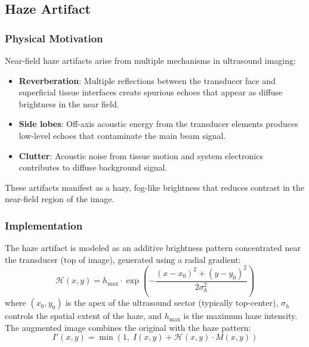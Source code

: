 \documentclass{article}
\theoremstyle{plain}
\theoremstyle{definition}
\theoremstyle{remark}
\begin{document}
\subsection{Haze Artifact}
\label{appendix:haze_artifact}

\subsubsection{Physical Motivation}

Near-field haze artifacts arise from multiple mechanisms in ultrasound imaging:
\begin{itemize}
    \item \textbf{Reverberation}: Multiple reflections between the transducer face and superficial tissue interfaces create spurious echoes that appear as diffuse brightness in the near field.
    \item \textbf{Side lobes}: Off-axis acoustic energy from the transducer elements produces low-level echoes that contaminate the main beam signal.
    \item \textbf{Clutter}: Acoustic noise from tissue motion and system electronics contributes to diffuse background signal.
\end{itemize}

These artifacts manifest as a hazy, fog-like brightness that reduces contrast in the near-field region of the image.

\subsubsection{Implementation}

The haze artifact is modeled as an additive brightness pattern concentrated near the transducer (top of image), generated using a radial gradient:
\begin{equation}
    \mathcal{H}(x, y) = h_{\max} \cdot \exp\left( -\frac{(x - x_0)^2 + (y - y_0)^2}{2\sigma_h^2} \right)
\end{equation}
where $(x_0, y_0)$ is the apex of the ultrasound sector (typically top-center), $\sigma_h$ controls the spatial extent of the haze, and $h_{\max}$ is the maximum haze intensity. The augmented image combines the original with the haze pattern:
\begin{equation}
    I'(x, y) = \min\left(1, \; I(x, y) + \mathcal{H}(x, y) \cdot M(x, y)\right)
\end{equation}
\end{document}
